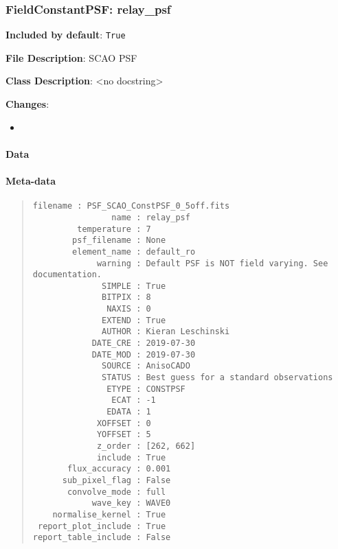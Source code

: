 \subsubsection{FieldConstantPSF: \textquotedbl{}relay\_psf\textquotedbl{}%
  \label{fieldconstantpsf-relay-psf}%
}

\textbf{Included by default}: \texttt{True}

\textbf{File Description}: SCAO PSF

\textbf{Class Description}: <no docstring>

\textbf{Changes}:

\begin{itemize}
\item \end{itemize}


\paragraph{Data%
  \label{data}%
}

\begin{figure}[H]
\noindent{}\label{fig-relay-psf}
\end{figure}


\paragraph{Meta-data%
  \label{meta-data}%
}

\begin{quote}
\begin{alltt}
\begin{lstlisting}[frame=single]
            filename : PSF_SCAO_ConstPSF_0_5off.fits
                name : relay_psf
         temperature : 7
        psf_filename : None
        element_name : default_ro
             warning : Default PSF is NOT field varying. See documentation.
              SIMPLE : True
              BITPIX : 8
               NAXIS : 0
              EXTEND : True
              AUTHOR : Kieran Leschinski
            DATE_CRE : 2019-07-30
            DATE_MOD : 2019-07-30
              SOURCE : AnisoCADO
              STATUS : Best guess for a standard observations
               ETYPE : CONSTPSF
                ECAT : -1
               EDATA : 1
             XOFFSET : 0
             YOFFSET : 5
             z_order : [262, 662]
             include : True
       flux_accuracy : 0.001
      sub_pixel_flag : False
       convolve_mode : full
            wave_key : WAVE0
    normalise_kernel : True
 report_plot_include : True
report_table_include : False
\end{lstlisting}
\end{alltt}
\end{quote}


